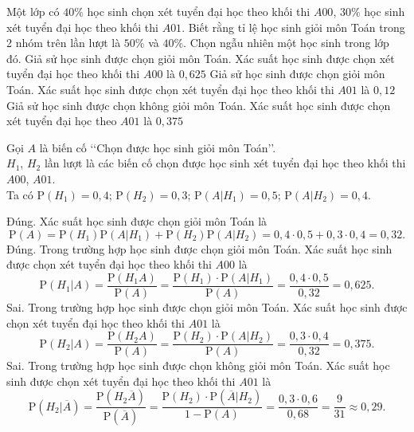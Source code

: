 \begin{ex}%
	Một lớp có $40\%$ học sinh chọn xét tuyển đại học theo khối thi $A00$, $30\%$ học sinh xét tuyển đại học theo khối thi $A01$. Biết rằng tỉ lệ học sinh giỏi môn Toán trong 2 nhóm trên lần lượt là $50\%$ và $40\%$. Chọn ngẫu nhiên một học sinh trong lớp đó.
	{\True Giả sử học sinh được chọn giỏi môn Toán. Xác suất học sinh được chọn xét tuyển đại học theo khối thi $A00$ là $0{,}625$}
	{Giả sử học sinh được chọn giỏi môn Toán. Xác suất học sinh được chọn xét tuyển đại học theo khối thi $A01$ là $0{,}12$}
	{Giả sử học sinh được chọn không giỏi môn Toán. Xác suất học sinh được chọn xét tuyển đại học theo $A01$ là $0{,}375$}
	\loigiai
	{
		Gọi $A$ là biến cố \lq\lq Chọn được học sinh giỏi môn Toán\rq\rq.\\
		$H_1$, $H_2$ lần lượt là các biến cố chọn được học sinh xét tuyển đại học theo khối thi $A00$, $A01$.\\
		Ta có $\mathrm{P}(H_1)=0{,}4$; $\mathrm{P}(H_2)= 0{,}3$; $\mathrm{P}(A|H_1)= 0{,}5$; $\mathrm{P}(A|H_2)= 0{,}4$.
		 \begin{itemchoice}
		 	\itemch Đúng. Xác suất học sinh được chọn giỏi môn Toán là
		 	\[
		 	\mathrm{P}(A)= \mathrm{P}(H_1)\mathrm{P}(A|H_1)+ \mathrm{P}(H_2)\mathrm{P}(A|H_2)= 0{,}4\cdot 0{,}5+ 0{,}3\cdot 0{,}4= 0{,}32.
		 	\]
		 	\itemch Đúng. Trong trường hợp học sinh được chọn giỏi môn Toán. Xác suất học sinh được chọn xét tuyển đại học theo khối thi $A00$ là
		 	\[
		 	\mathrm{P}(H_1|A)= \dfrac{\mathrm{P}(H_1A)}{\mathrm{P}(A)}= \dfrac{\mathrm{P}(H_1) \cdot \mathrm{P}(A|H_1)}{\mathrm{P}(A)}= \dfrac{0{,}4\cdot 0{,}5}{0{,}32}= 0{,}625.
		 	\]
		 	\itemch Sai. Trong trường hợp học sinh được chọn giỏi môn Toán. Xác suất học sinh được chọn xét tuyển đại học theo khối thi $A01$ là
		 	\[
		 	\mathrm{P}(H_2|A)= \dfrac{\mathrm{P}(H_2A)}{\mathrm{P}(A)}= \dfrac{\mathrm{P}(H_2) \cdot \mathrm{P}(A|H_2)}{\mathrm{P}(A)}= \dfrac{0{,}3\cdot 0{,}4}{0{,}32}= 0{,}375.
		 	\]
		 	\itemch Sai. Trong trường hợp học sinh được chọn không giỏi môn Toán. Xác suất học sinh được chọn xét tuyển đại học theo khối thi $A01$ là
		 	\[
		 	\mathrm{P}\left(H_2|\overline{A}\right)= \dfrac{\mathrm{P}\left(H_2\overline{A}\right)}{\mathrm{P}\left(\overline{A}\right)}= \dfrac{\mathrm{P}(H_2) \cdot \mathrm{P}\left(\overline{A}|H_2\right)}{1-\mathrm{P}(A)}= \dfrac{0{,}3\cdot 0{,}6}{0{,}68}= \dfrac{9}{31} \approx 0{,}29.
		 	\]		 	
		 \end{itemchoice}
	}
\end{ex}


